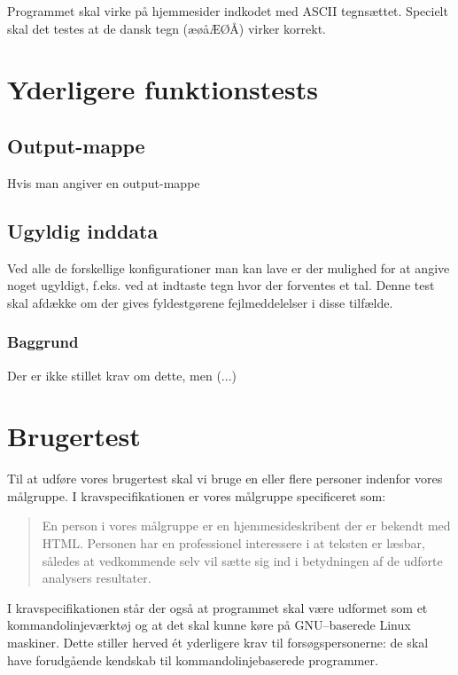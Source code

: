 \documentclass[a4paper,oneside,article, titlepage]{memoir}
\begin{document}
Programmet skal virke på hjemmesider indkodet med ASCII
tegnsættet. Specielt skal det testes at de dansk tegn (æøåÆØÅ) virker
korrekt.

\chapter{Yderligere funktionstests}

\section{Output-mappe}
Hvis man angiver en output-mappe

\section{Ugyldig inddata}
Ved alle de forskellige konfigurationer man kan lave er der mulighed
for at angive noget ugyldigt, f.eks. ved at indtaste tegn hvor der
forventes et tal. Denne test skal afdække om der gives fyldestgørene
fejlmeddelelser i disse tilfælde.

\subsection{Baggrund}
Der er ikke stillet krav om dette, men (...)

\chapter{Brugertest}

Til at udføre vores brugertest skal vi bruge en eller flere personer
indenfor vores målgruppe. I kravspecifikationen er vores målgruppe
specificeret som:
\begin{quote}
En person i vores målgruppe er en hjemmesideskribent der er bekendt
med HTML. Personen har en professionel interessere i at teksten er
læsbar, således at vedkommende selv vil sætte sig ind i betydningen af
de udførte analysers resultater.
\end{quote}

I kravspecifikationen står der også at programmet skal være udformet
som et kommandolinjeværktøj og at det skal kunne køre på GNU--baserede
Linux maskiner. Dette stiller herved ét yderligere krav til
forsøgspersonerne: de skal have forudgående kendskab til
kommando\-linje\-baserede programmer.
\end{document}
